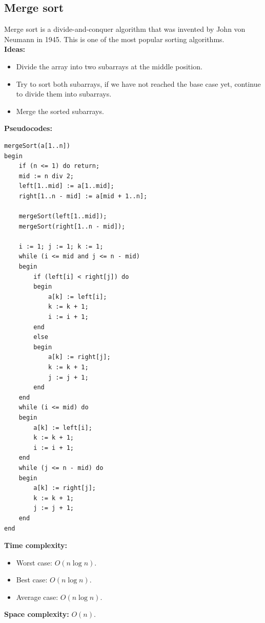 \documentclass[12pt,a4paper]{article}
\begin{document}
\subsection{Merge sort}
Merge sort is a divide-and-conquer algorithm that was invented by John von Neumann in 1945. This is one of the most popular sorting algorithms. \\
\textbf{Ideas:} 
\begin{itemize}
\item Divide the array into two subarrays at the middle position.
\item Try to sort both subarrays, if we have not reached the base case yet, continue to divide them into subarrays.
\item Merge the sorted subarrays.
\end{itemize}
\textbf{Pseudocodes:}
\lstset{language=Pascal} 
\begin{lstlisting}[caption = {Merge sort}]
mergeSort(a[1..n])
begin
	if (n <= 1) do return;
	mid := n div 2;
	left[1..mid] := a[1..mid];
	right[1..n - mid] := a[mid + 1..n];
	
	mergeSort(left[1..mid]);
	mergeSort(right[1..n - mid]);
	
	i := 1; j := 1; k := 1;
	while (i <= mid and j <= n - mid)
	begin
		if (left[i] < right[j]) do 
		begin 
			a[k] := left[i];
			k := k + 1;
			i := i + 1;
		end 
		else 
		begin
			a[k] := right[j];
			k := k + 1;
			j := j + 1;
		end
	end
	while (i <= mid) do
	begin
		a[k] := left[i];
		k := k + 1;
		i := i + 1;	
	end
	while (j <= n - mid) do
	begin
		a[k] := right[j];
		k := k + 1;
		j := j + 1;
	end
end
\end{lstlisting}
\textbf{Time complexity:}  \cite{merge}
\begin{itemize}
\item Worst case: $O \left( {n \log n} \right).$
\item Best case: $O \left( {n \log n} \right).$
\item Average case: $O \left( {n \log n} \right).$
\end{itemize}
\textbf{Space complexity:} $O \left( {n} \right).$ \cite{merge}
\end{document}
